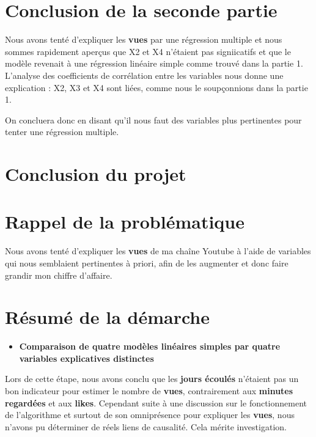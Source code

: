 \hypertarget{conclusion-de-la-seconde-partie}{%
\section{Conclusion de la seconde
partie}\label{conclusion-de-la-seconde-partie}}

Nous avons tenté d'expliquer les \textbf{vues} par une régression
multiple et nous sommes rapidement aperçus que X2 et X4 n'étaient pas
signiicatifs et que le modèle revenait à une régression linéaire simple
comme trouvé dans la partie 1. L'analyse des coefficients de corrélation
entre les variables nous donne une explication : X2, X3 et X4 sont
liées, comme nous le soupçonnions dans la partie 1.

On concluera donc en disant qu'il nous faut des variables plus
pertinentes pour tenter une régression multiple. \newpage

\hypertarget{conclusion-du-projet}{%
\section{Conclusion du projet}\label{conclusion-du-projet}}

\hypertarget{rappel-de-la-probluxe9matique}{%
\section{Rappel de la
problématique}\label{rappel-de-la-probluxe9matique}}

Nous avons tenté d'expliquer les \textbf{vues} de ma chaîne Youtube à
l'aide de variables qui nous semblaient pertinentes à priori, afin de
les augmenter et donc faire grandir mon chiffre d'affaire.

\hypertarget{ruxe9sumuxe9-de-la-duxe9marche}{%
\section{Résumé de la démarche}\label{ruxe9sumuxe9-de-la-duxe9marche}}

\begin{itemize}
\tightlist
\item
  \textbf{Comparaison de quatre modèles linéaires simples par quatre
  variables explicatives distinctes}
\end{itemize}

Lors de cette étape, nous avons conclu que les \textbf{jours écoulés}
n'étaient pas un bon indicateur pour estimer le nombre de \textbf{vues},
contrairement aux \textbf{minutes regardées} et aux \textbf{likes}.
Cependant suite à une discussion sur le fonctionnement de l'algorithme
et surtout de son omniprésence pour expliquer les \textbf{vues}, nous
n'avons pu déterminer de réels liens de causalité. Cela mérite
investigation.

